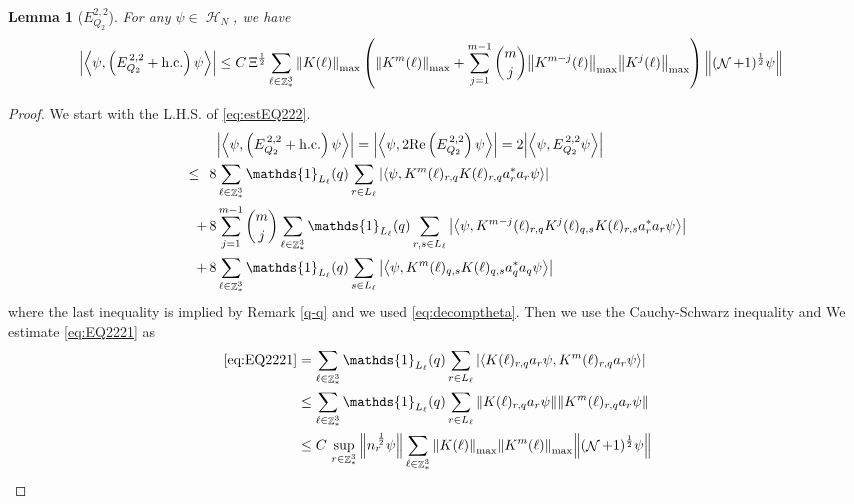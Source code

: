 \documentclass[sn-mathphys, Numbered ,a4paper]{sn-jnl}%
\DeclareMathOperator{\Z}{\mathbb{Z}}
\DeclareMathOperator{\HH}{\mathcal{H}}
\DeclareMathOperator{\NN}{\mathcal{N}}
\newcommand{\half}{\frac{1}{2}}
\newcommand{\eva}[1]{\left\langle #1 \right\rangle}
\theoremstyle{plain}
\newtheorem{lemma}[theorem]{Lemma}
\theoremstyle{definition}
\theoremstyle{remark}
\theoremstyle{plain}
\theoremstyle{definition}
\theoremstyle{remark}
\begin{document}
\begin{lemma}[$E_{Q_2}^{2,2}$]
For any $\psi \in \HH_N$, we have
\begin{align}
    \abs{\eva{\psi,\left(E^{\,2,2}_{Q_2}+\mathrm{h.c.}\right) \psi }}
    &\leq   C\,\Xi^\half \sum\limits_{\ell \in \Z^3_*} \norm{K(\ell)}_{\mathrm{max}} \left(\norm{K^m(\ell)}_{\mathrm{max}} + \sum\limits_{j=1}^{m-1} {{m}\choose j} \norm{K^{m-j}(\ell)}_{\mathrm{max}} \norm{K^j(\ell)}_{\mathrm{max}} \right) \norm{(\NN+1)^\half \psi} \label{eq:estEQ222}
    \end{align}
\end{lemma}
\begin{proof}
We start with the L.H.S. of \eqref{eq:estEQ222}.
\begin{align}
	&\abs{\eva{\psi,\left(E^{\,2,2}_{Q_2}+\mathrm{h.c.}\right) \psi }} = \abs{\eva{\psi,2\mathrm{Re}\left(E^{\,2,2}_{Q_2}\right) \psi }} = 2\abs{\eva{\psi, E^{\,2,2}_{Q_2} \psi }}\nonumber\\
	\leq\,\;8& \sum\limits_{\ell \in \Z^3_*} \mathds{1}_{L_{\ell}}(q) \sum\limits_{r\in L_{\ell}} \abs{\eva{\psi, K^m(\ell)_{r,q} K(\ell)_{r,q} a^*_{r} a_{r} \psi }}\label{eq:EQ2221}\\
	+\,8& \sum\limits_{j=1}^{m-1} {{m}\choose j} \sum\limits_{\ell \in \Z^3_*}\mathds{1}_{L_{\ell}}(q) \sum\limits_{r,s\in L_{\ell}}  \abs{\eva{\psi,K^{m-j}(\ell)_{r,q} K^{j}(\ell)_{q,s} K(\ell)_{r,s} a^*_{r} a_{r}   \psi }}\label{eq:EQ2222}\\
	+\,8&\sum\limits_{\ell \in \Z^3_*} \mathds{1}_{L_{\ell}}(q) \sum\limits_{ s \in L_{\ell}} \abs{\eva{\psi, K^m(\ell)_{q,s} K(\ell)_{q,s} a^*_{q} a_{q} \psi }}\label{eq:EQ2223}
\end{align}
where the last inequality is implied by Remark \ref{q-q} and we used \eqref{eq:decomptheta}. Then we use the Cauchy-Schwarz inequality and We estimate \eqref{eq:EQ2221} as 
\begin{align}
	\eqref{eq:EQ2221}
	&= \sum\limits_{\ell \in \Z^3_*} \mathds{1}_{L_{\ell}}(q) \sum\limits_{r\in L_{\ell}} \abs{\eva{ K(\ell)_{r,q} a_{r} \psi, K^m(\ell)_{r,q}  a_{r} \psi }}\nonumber\\
	&\leq \sum\limits_{\ell \in \Z^3_*} \mathds{1}_{L_{\ell}}(q) \sum\limits_{r\in L_{\ell}} \norm{ K(\ell)_{r,q} a_{r} \psi}\norm{ K^m(\ell)_{r,q}  a_{r} \psi }\nonumber\\
	&\leq C\,\sup\limits_{r\in \Z^3_*}\norm{n_r^{\,\half}\psi} \sum\limits_{\ell \in \Z^3_*} \norm{K(\ell)}_{\mathrm{max}} \norm{K^m(\ell)}_{\mathrm{max}}  \norm{  (\NN+1)^\half \psi}\nonumber\\

\end{align}
\end{proof}
\end{document}
